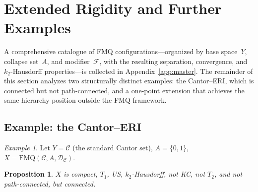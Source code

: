 \documentclass[11pt]{article}
\newtheorem{proposition}[theorem]{Proposition}
\theoremstyle{definition}
\theoremstyle{remark}
\newtheorem{example}[theorem]{Example}
\begin{document}
\section{Extended Rigidity and Further Examples}\label{sec:extended}

A comprehensive catalogue of FMQ configurations---organized by base
space~$Y$, collapse set~$A$, and modifier~$\mathcal{F}$, with the
resulting separation, convergence, and $k_2$-Hausdorff properties---is
collected in Appendix~\ref{app:master}.
The remainder of this section analyzes two structurally distinct
examples: the Cantor--ERI, which is connected but not path-connected,
and a one-point extension that achieves the same hierarchy position
outside the FMQ framework.

\subsection{Example: the Cantor--ERI}

\begin{example}\label{ex:cantor}
Let $Y = \mathcal{C}$ (the standard Cantor set), $A = \{0,1\}$,
$X = \mathrm{FMQ}(\mathcal{C}, A, \mathcal{D}_{\mathcal{C}})$.
\end{example}

\begin{proposition}\label{prop:cantor}
$X$ is compact, $T_1$, US, $k_2$-Hausdorff, not KC, not $T_2$, and not
path-connected, but connected.
\end{proposition}
\end{document}
